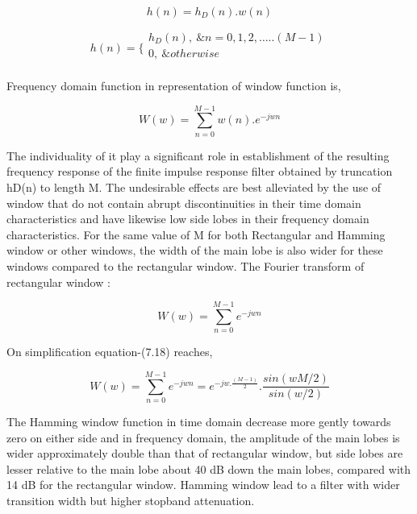\begin{enumerate}[label=\roman*]
\begin{equation}\tag{7.15}
h ( n ) =h_{D} ( n ) .w ( n )
\end{equation}

\begin{equation}\tag{7.16}
h ( n ) = \{ \begin{array}{ll}
	h_{D} ( n ) ,~ \&n=0,1,2, \ldots .. ( M-1 ) \\
	0,~ \&otherwise\\
	\end{array}
\end{equation}
\begin{justify}
Frequency domain function in representation of window function is,
\end{justify}\par


\begin{equation}\tag{7.17}
W ( w ) = \sum _{n=0}^{M-1}w ( n ) .e^{-jwn}
\end{equation}
\begin{justify}
The individuality of it play a significant role in establishment of the resulting frequency response of the finite impulse response filter obtained by truncation hD(n) to length M. The undesirable effects are best alleviated by the use of window that do not contain abrupt discontinuities in their time domain characteristics and have likewise low side lobes in their frequency domain characteristics. For the same value of M for both Rectangular and Hamming window or other windows, the width of the main lobe is also wider for these windows compared to the rectangular window. The Fourier transform of rectangular window \cite{movlaee2018microwave,goutham2018flexible,arif2018gait,tischler2018system,sloo2018smart,losey2018review,yilmaz2018pv,he2017adaptive,walczak2019artificial,comer2018internet}:
\end{justify}\par


\begin{equation}\tag{7.18}
W ( w ) = \sum _{n=0}^{M-1}e^{-jwn}
\end{equation}
\begin{justify}
On simplification equation-(7.18) reaches,
\end{justify}\par


\begin{equation}\tag{7.19}
W ( w ) = \sum _{n=0}^{M-1}e^{-jwn}=e^{-jw.\frac{ ( M-1 ) }{2}}.\frac{sin ( wM/2 ) }{sin ( w/2 ) }
\end{equation}
\begin{justify}
The Hamming window function in time domain decrease more gently towards zero on either side and in frequency domain, the amplitude of the main lobes is wider approximately double than that of rectangular window, but side lobes are lesser relative to the main lobe about 40 dB down the main lobes, compared with 14 dB for the rectangular window. Hamming window lead to a filter with wider transition width but higher stopband attenuation.
\end{justify}\par



\end{enumerate}
